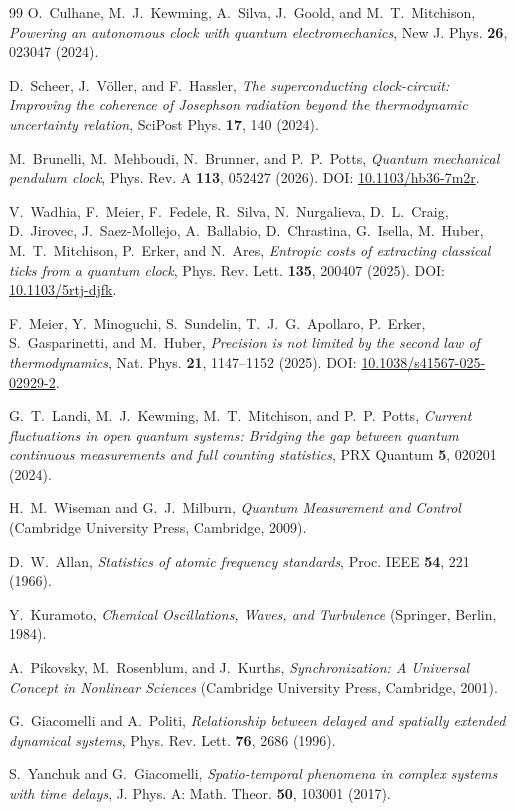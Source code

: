 \documentclass[aps,pre,reprint,amsmath,amssymb,floatfix,nofootinbib]{revtex4-2}
\begin{document}
\begin{thebibliography}{99}
O.~Culhane, M.~J.~Kewming, A.~Silva, J.~Goold, and M.~T.~Mitchison,
\emph{Powering an autonomous clock with quantum electromechanics},
New J. Phys. \textbf{26}, 023047 (2024).

D.~Scheer, J.~V\"oller, and F.~Hassler,
\emph{The superconducting clock-circuit: Improving the coherence of Josephson radiation beyond the thermodynamic uncertainty relation},
SciPost Phys. \textbf{17}, 140 (2024).

M.~Brunelli, M.~Mehboudi, N.~Brunner, and P.~P.~Potts,
\emph{Quantum mechanical pendulum clock},
Phys. Rev. A \textbf{113}, 052427 (2026).
DOI: \href{https://doi.org/10.1103/hb36-7m2r}{10.1103/hb36-7m2r}.

V.~Wadhia, F.~Meier, F.~Fedele, R.~Silva, N.~Nurgalieva,
D.~L.~Craig, D.~Jirovec, J.~Saez-Mollejo, A.~Ballabio,
D.~Chrastina, G.~Isella, M.~Huber, M.~T.~Mitchison,
P.~Erker, and N.~Ares,
\emph{Entropic costs of extracting classical ticks from a quantum clock},
Phys. Rev. Lett. \textbf{135}, 200407 (2025).
DOI: \href{https://doi.org/10.1103/5rtj-djfk}{10.1103/5rtj-djfk}.

F.~Meier, Y.~Minoguchi, S.~Sundelin, T.~J.~G.~Apollaro, P.~Erker, S.~Gasparinetti, and M.~Huber,
\emph{Precision is not limited by the second law of thermodynamics},
Nat. Phys. \textbf{21}, 1147--1152 (2025).
DOI: \href{https://doi.org/10.1038/s41567-025-02929-2}{10.1038/s41567-025-02929-2}.

G.~T.~Landi, M.~J.~Kewming, M.~T.~Mitchison, and P.~P.~Potts,
\emph{Current fluctuations in open quantum systems: Bridging the gap between quantum continuous measurements and full counting statistics},
PRX Quantum \textbf{5}, 020201 (2024).

H.~M.~Wiseman and G.~J.~Milburn,
\emph{Quantum Measurement and Control}
(Cambridge University Press, Cambridge, 2009).

D.~W.~Allan,
\emph{Statistics of atomic frequency standards},
Proc. IEEE \textbf{54}, 221 (1966).

Y.~Kuramoto,
\emph{Chemical Oscillations, Waves, and Turbulence}
(Springer, Berlin, 1984).

A.~Pikovsky, M.~Rosenblum, and J.~Kurths,
\emph{Synchronization: A Universal Concept in Nonlinear Sciences}
(Cambridge University Press, Cambridge, 2001).

G.~Giacomelli and A.~Politi,
\emph{Relationship between delayed and spatially extended dynamical systems},
Phys. Rev. Lett. \textbf{76}, 2686 (1996).

S.~Yanchuk and G.~Giacomelli,
\emph{Spatio-temporal phenomena in complex systems with time delays},
J. Phys. A: Math. Theor. \textbf{50}, 103001 (2017).

\end{thebibliography}
\end{document}
